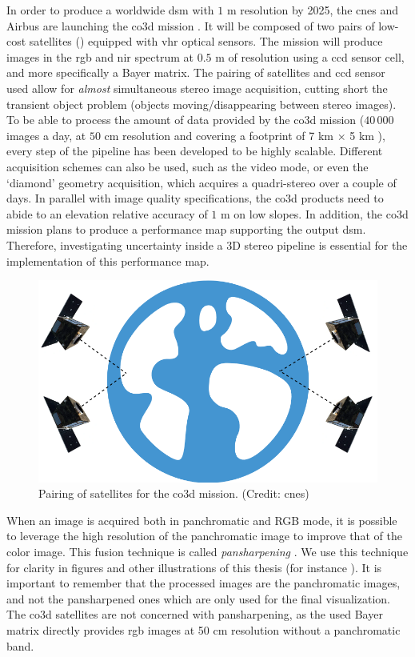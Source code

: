 In order to produce a worldwide \acrshort{dsm} with $1$ m resolution by 2025, the \acrfull{cnes} and Airbus are launching the \acrfull{co3d} mission \cite{melet_co3d_2020}. It will be composed of two pairs of low-cost satellites () equipped with \acrshort{vhr} optical sensors. The mission will produce images in the \acrshort{rgb} and \acrshort{nir} spectrum at $0.5$ m of resolution \cite{lebegue_co3d_2020} using a \acrshort{ccd} sensor cell, and more specifically a Bayer matrix. The pairing of satellites and \acrshort{ccd} sensor used allow for \textit{almost} simultaneous stereo image acquisition, cutting short the transient object problem (\ie objects moving/disappearing between stereo images). To be able to process the amount of data provided by the \acrshort{co3d} mission ($40\,000$ images a day, at $50$ cm resolution and covering a footprint of 7 km $\times$ 5 km \cite{melet_co3d_2020, lebegue_co3d_2020}), every step of the pipeline has been developed to be highly scalable. Different acquisition schemes can also be used, such as the video mode, or even the `diamond' geometry acquisition, which acquires a quadri-stereo over a couple of days. In parallel with image quality specifications, the \acrshort{co3d} products need to abide to an elevation relative accuracy of $1$ m on low slopes. In addition, the \acrshort{co3d} mission plans to produce a performance map supporting the output \acrshort{dsm}. Therefore, investigating uncertainty inside a 3D stereo pipeline is essential for the implementation of this performance map.

\begin{figure}
    \centering
    \includegraphics[width=0.6\linewidth]{Images/Chap_1/CO3D_schema.png}
    \caption{Pairing of satellites for the \acrshort{co3d} mission. (Credit: \acrshort{cnes})}
    \label{fig:co3d_mission}
\end{figure}

\begin{remark}
    When an image is acquired both in panchromatic and RGB mode, it is possible to leverage the high resolution of the panchromatic image to improve that of the color image. This fusion technique is called \textit{pansharpening} \cite{loncan_hyperspectral_2015}. We use this technique for clarity in figures and other illustrations of this thesis (for instance ). It is important to remember that the processed images are the panchromatic images, and not the pansharpened ones which are only used for the final visualization. The \acrshort{co3d} satellites are not concerned with pansharpening, as the used Bayer matrix directly provides \acrshort{rgb} images at 50 cm resolution without a panchromatic band.
\end{remark} 

